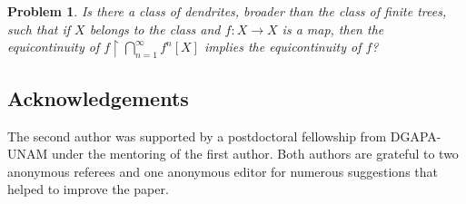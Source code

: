 \documentclass[12pt]{amsart}
\newtheorem{problem}[theorem]{Problem}
\theoremstyle{definition}
\numberwithin{equation}{section}
\begin{document}
\begin{problem}
Is there a class of dendrites, broader than the class of finite trees, such that if $X$ belongs to the class and $f:X\longrightarrow X$ is a map, then the equicontinuity of $f\upharpoonright\bigcap_{n=1}^\infty f^n[X]$ implies the equicontinuity of $f$?
\end{problem}


\subsection*{Acknowledgements}
The second author was supported by a postdoctoral fellowship from DGAPA-UNAM under the mentoring of the first author. Both authors are grateful to two anonymous referees and one anonymous editor for numerous suggestions that helped to improve the paper.



\normalsize
\end{document}
